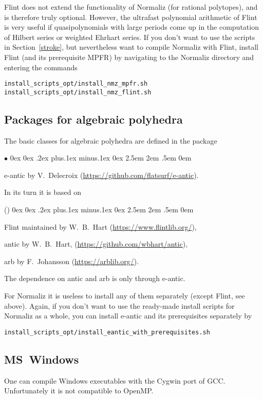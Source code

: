 \documentclass[12pt,a4paper]{scrartcl}
\newcounter{listi}
\newcommand{\stdli}{ \topsep0ex \partopsep0ex %
\parsep.2ex plus.1ex minus.1ex \itemsep0ex%
\leftmargin2.5em \labelwidth2em \labelsep.5em \rightmargin0em}%
\newenvironment{arab}{\begin{list}{\textup{(\arabic{listi})}}%
	{\usecounter{listi}\stdli}}{\end{list}}
\renewenvironment{itemize}{\begin{list}{{$\bullet$}}{\stdli}}{\end{list}}
\theoremstyle{definition}
\begin{document}
Flint does not extend the functionality of Normaliz (for rational polytopes), and is therefore truly optional.
However, the ultrafast polynomial arithmetic of Flint is very useful if quasipolynomials with large periods come up in the computation of Hilbert series or weighted Ehrhart series. If you don't want to use the scripts in Section~\ref{stroke}, but nevertheless want to compile Normaliz with Flint, install Flint (and its prerequisite MPFR) by navigating to the Normaliz directory and entering the commands
\begin{Verbatim}
install_scripts_opt/install_nmz_mpfr.sh
install_scripts_opt/install_nmz_flint.sh
\end{Verbatim}

\subsection{Packages for algebraic polyhedra}

The basic classes for algebraic polyhedra are defined in the package
\begin{itemize}
	\item[] e-antic by V.~Delecroix (\url{https://github.com/flatsurf/e-antic}).
\end{itemize}
In its turn it is based on
\begin{arab}
	\item Flint maintained by W.~B.~Hart (\url{https://www.flintlib.org/}),
	\item antic by W.~B.~Hart, (\url{https://github.com/wbhart/antic}),
	\item arb by F.~Johansson (\url{https://arblib.org/}).
\end{arab}

The dependence on antic and arb is only through e-antic.

For Normaliz it is useless to install any of them separately (except Flint, see above). Again, if you don't want to use the ready-made install scripts for Normaliz as a whole, you can install e-antic and its prerequisites separately by
\begin{Verbatim}
install_scripts_opt/install_eantic_with_prerequisites.sh
\end{Verbatim}

\subsection{MS~Windows}

One can compile Windows executables with the Cygwin port of GCC. Unfortunately it is not compatible to OpenMP.
\end{document}
